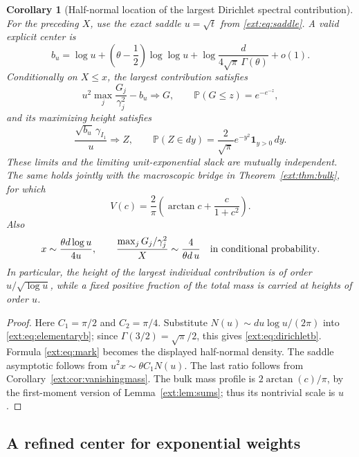 \documentclass[11pt]{article}
\newtheorem{corollary}[theorem]{Corollary}
\theoremstyle{definition}
\theoremstyle{remark}
\begin{document}
\begin{corollary}[Half-normal location of the largest Dirichlet spectral contribution]
\label{ext:cor:dirichlet}
For the preceding $X$, use the exact saddle $u=\sqrt t$ from
\eqref{ext:eq:saddle}.  A valid explicit center is
\begin{equation}\label{ext:eq:dirichletb}
 b_u=\log u+\left(\theta-\frac12\right)\log\log u
        +\log\frac{d}{4\sqrt\pi\,\Gamma(\theta)}+o(1).
\end{equation}
Conditionally on $X\le x$, the largest contribution satisfies
\[
 u^2\max_j\frac{G_j}{\gamma_j^2}-b_u
       \Longrightarrow G,
 \qquad \mathbb P(G\le z)=e^{-e^{-z}},
\]
and its maximizing height satisfies
\[
 \frac{\sqrt{b_u}\,\gamma_{I_1}}u\Longrightarrow Z,
 \qquad
 \mathbb P(Z\in dy)=\frac2{\sqrt\pi}e^{-y^2}\mathbf1_{y>0}\,dy.
\]
These limits and the limiting unit-exponential slack are mutually
independent.  The same holds jointly with the macroscopic bridge in
Theorem~\ref{ext:thm:bulk}, for which
\[
 V(c)=\frac2\pi\left(\arctan c+\frac{c}{1+c^2}\right).
\]
Also
\[
 x\sim\frac{\theta d\log u}{4u},\qquad
 \frac{\max_jG_j/\gamma_j^2}{X}
       \sim\frac4{\theta d\,u}
 \quad\hbox{in conditional probability}.
\]
In particular, the height of the largest individual contribution is
of order $u/\sqrt{\log u}$, while a fixed positive fraction of the total
mass is carried at heights of order $u$.
\end{corollary}

\begin{proof}
Here $C_1=\pi/2$ and $C_2=\pi/4$.  Substitute
$N(u)\sim d u\log u/(2\pi)$ into
\eqref{ext:eq:elementaryb}; since
$\Gamma(3/2)=\sqrt\pi/2$, this gives
\eqref{ext:eq:dirichletb}.  Formula \eqref{ext:eq:mark} becomes the
displayed half-normal density.  The saddle asymptotic follows from
$u^2x\sim\theta C_1N(u)$.  The last ratio follows from
Corollary~\ref{ext:cor:vanishingmass}.  The bulk mass profile is
$2\arctan(c)/\pi$, by the first-moment version of
Lemma~\ref{ext:lem:sums}; thus its nontrivial scale is $u$.
\end{proof}


\subsection{A refined center for exponential weights}
\label{ext:sec:refinedcenter}
\end{document}
